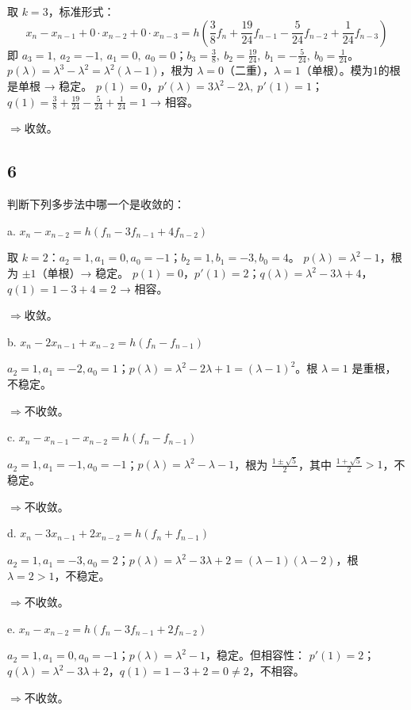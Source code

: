 \documentclass{article}
\begin{document}
取 \(k=3\)，标准形式：
\[
x_n - x_{n-1} + 0\cdot x_{n-2} + 0\cdot x_{n-3} = h\left(\frac{3}{8}f_n + \frac{19}{24}f_{n-1} - \frac{5}{24}f_{n-2} + \frac{1}{24}f_{n-3}\right)
\]
即 \(a_3=1,\ a_2=-1,\ a_1=0,\ a_0=0\)；\(b_3=\frac{3}{8},\ b_2=\frac{19}{24},\ b_1=-\frac{5}{24},\ b_0=\frac{1}{24}\)。  
\(p(\lambda)=\lambda^3-\lambda^2=\lambda^2(\lambda-1)\)，根为 \(\lambda=0\)（二重），\(\lambda=1\)（单根）。模为1的根是单根 → 稳定。  
\(p(1)=0\)，\(p'(\lambda)=3\lambda^2-2\lambda,\ p'(1)=1\)；\(q(1)=\frac{3}{8}+\frac{19}{24}-\frac{5}{24}+\frac{1}{24}=1\) → 相容。  

$\Rightarrow$收敛。

\subsection*{6}
判断下列多步法中哪一个是收敛的：

a. \(x_n - x_{n-2} = h(f_n - 3f_{n-1} + 4f_{n-2})\)

取 \(k=2\)：\(a_2=1, a_1=0, a_0=-1\)；\(b_2=1, b_1=-3, b_0=4\)。  
\(p(\lambda)=\lambda^2-1\)，根为 \(\pm1\)（单根）→ 稳定。  
\(p(1)=0\)，\(p'(1)=2\)；\(q(\lambda)=\lambda^2-3\lambda+4\)，\(q(1)=1-3+4=2\) → 相容。  

$\Rightarrow$收敛。

b. \(x_n - 2x_{n-1} + x_{n-2} = h(f_n - f_{n-1})\)

\(a_2=1, a_1=-2, a_0=1\)；\(p(\lambda)=\lambda^2-2\lambda+1=(\lambda-1)^2\)。根 \(\lambda=1\) 是重根，不稳定。  

$\Rightarrow$不收敛。

c. \(x_n - x_{n-1} - x_{n-2} = h(f_n - f_{n-1})\)

\(a_2=1, a_1=-1, a_0=-1\)；\(p(\lambda)=\lambda^2-\lambda-1\)，根为 \(\frac{1\pm\sqrt{5}}{2}\)，其中 \(\frac{1+\sqrt{5}}{2}>1\)，不稳定。  

$\Rightarrow$不收敛。

d. \(x_n - 3x_{n-1} + 2x_{n-2} = h(f_n + f_{n-1})\)

\(a_2=1, a_1=-3, a_0=2\)；\(p(\lambda)=\lambda^2-3\lambda+2=(\lambda-1)(\lambda-2)\)，根 \(\lambda=2>1\)，不稳定。  

$\Rightarrow$不收敛。

e. \(x_n - x_{n-2} = h(f_n - 3f_{n-1} + 2f_{n-2})\)

\(a_2=1, a_1=0, a_0=-1\)；\(p(\lambda)=\lambda^2-1\)，稳定。但相容性：  
\(p'(1)=2\)；\(q(\lambda)=\lambda^2-3\lambda+2\)，\(q(1)=1-3+2=0 \neq 2\)，不相容。  

$\Rightarrow$不收敛。
\end{document}
